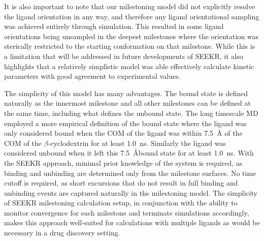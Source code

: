 

\par It is also important to note that our milestoning model did not explicitly 
resolve the ligand orientation in any way, and therefore any ligand orientational 
sampling was achieved entirely through simulation. This resulted in some ligand 
orientations being unsampled in the deepest milestones where the orientation was 
sterically restricted to the starting conformation on that milestone. While this 
is a limitation that will be addressed in future developments of SEEKR, it also 
highlights that a relatively simplistic model was able effectively calculate 
kinetic parameters with good agreement to experimental values.

\par The simplicity of this model has many advantages. The bound state is 
defined naturally as the innermost milestone and all other milestones can be 
defined at the same time, including what defines the unbound state. The long 
timescale MD employed a more empirical definition of the bound state where the 
ligand was only considered bound when the COM of the ligand was within 7.5~\AA 
of the COM of the $\beta$-cyclodextrin for at least 1.0~ns. Similarly the ligand 
was considered unbound when it left this 7.5~\AA bound state for at least 1.0~ns.
With the SEEKR approach, minimal prior knowledge of the system is required, as 
binding and unbinding are determined only from the milestone surfaces. No time 
cutoff is required, as short excursions that do not result in full binding and 
unbinding events are captured naturally in the milestoning model. The simplicity of SEEKR milestoning calculation setup, in conjunction with
the ability to monitor convergence for each milestone and terminate
simulations accordingly, makes this approach well-suited for
calculations with multiple ligands as would be necessary in a drug
discovery setting.